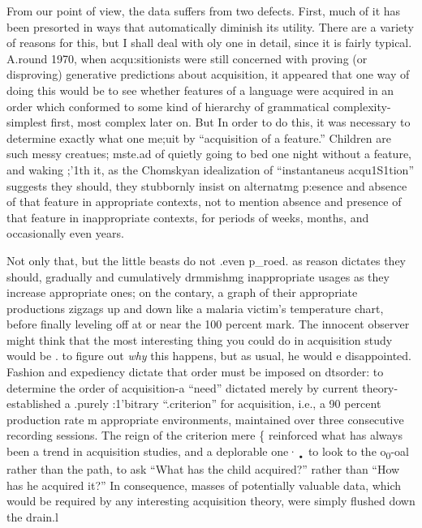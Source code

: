 From our point of view, the data suffers from two defects. First,
much of it has been presorted in ways that automatically diminish its utility. There are a variety of reasons for this, but I shall deal with oly one in detail, since it is fairly typical. A.round 1970, when acqu:si\-tionists were still concerned with proving (or disproving) generative predictions about acquisition, it appeared that one way of doing this would be to see whether features of a language were acquired in an order which conformed to some kind of hierarchy of grammatical complexity-simplest first, most complex later on. But In order to do this, it was necessary to determine exactly what one me;uit by ``acquisition of a feature.'' Children are such messy creatues; mste.ad of quietly going to bed one night without a feature, and waking ;'1th it, as the Chomskyan idealization of ``instantaneus acqu1S1tion'' suggests they should, they stubbornly insist on alternatmg p:esence and absence of that feature in appropriate contexts, not to mention absence and presence of that feature in inappropriate contexts, for periods of weeks, months, and occasionally even years.

Not only that, but the little beasts do not .even p\_roed. as
reason dictates they should, gradually and cumulatively drmmishmg inappropriate usages as they increase appropriate ones; on the contary, a graph of their appropriate productions zigzags up and down like a malaria victim's temperature chart, before finally leveling off at or near the 100 percent mark. The innocent observer might think that the most interesting thing you could do in acquisition study would be . to figure out \textit{why} this happens, but as usual, he would e disappointed. Fashion and expediency dictate that order must be imposed on dts\-order: to determine the order of acquisition-a ``need'' dictated merely by current theory{}-\citet{Brown1973} established a .purely :1'bitrary ``.cri\-terion'' for acquisition, i.e., a 90 percent production rate m appropriate environments, maintained over three consecutive recording sessions. The reign of the criterion mere \{ reinforced what has always been
a trend in acquisition studies, and a deplorable one·\textsubscript{•}\textsubscript{ }to look to the o\textsubscript{0}{}-oal rather than the path, to ask ``What has the child acquired?'' rather than
``How has he acquired it?'' In consequence, masses of potentially valuable data, which would be required by any interesting acquisition theory, were simply flushed down the drain.l

